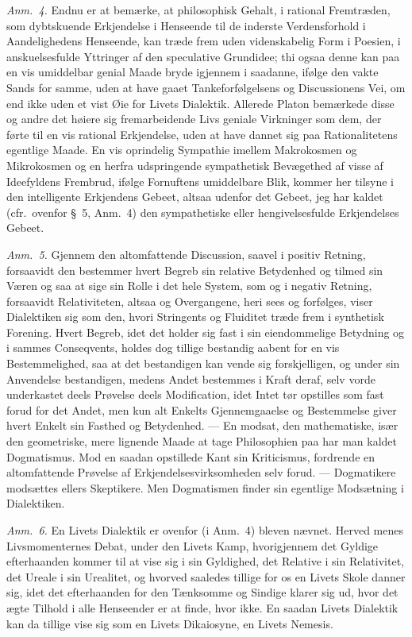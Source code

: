 \documentclass[12pt,a4paper]{book}
\newcommand{\apage}[1]{\marginnote{\footnotesize\textit{[#1]}}}
\begin{document}
{\small\emph{Anm.~4.} Endnu er at bemærke, at philosophisk Gehalt, i rational
Fremtræden, som dybtskuende Erkjendelse i Henseende til de inderste Verdensforhold i
Aandelighedens Henseende, kan træde frem uden videnskabelig Form i Poesien, i
anskuelsesfulde Yttringer af den speculative Grundidee; thi ogsaa denne kan paa en
vis umiddelbar genial Maade bryde igjennem i saadanne, ifølge den vakte Sands for
samme, uden at have gaaet Tankeforfølgelsens og Discussionens Vei, om end ikke uden
et vist Øie for Livets Dialektik. Allerede Platon bemærkede disse og andre det
høiere sig fremarbeidende Livs geniale Virkninger som dem, der førte til en vis
rational Erkjendelse, uden at have dannet sig paa Rationalitetens egentlige Maade. En
vis oprindelig Sympathie imellem Makrokosmen og Mikrokosmen og en herfra
udspringende sympathetisk Bevægethed af visse af Ideefyldens Frembrud, ifølge
Fornuftens umiddelbare Blik, kommer her tilsyne i den intelligente Erkjendens Gebeet,
altsaa udenfor det Gebeet, jeg har kaldet (cfr.\ ovenfor \S~5, Anm.~4) den
sympathetiske eller hengivelsesfulde Erkjendelses Gebeet.\par} \apage{70} 

{\small\emph{Anm.~5.} Gjennem den altomfattende Discussion, saavel i positiv Retning,
forsaavidt den bestemmer hvert Begreb sin relative Betydenhed og tilmed sin Væren og
saa at sige sin Rolle i det hele System, som og i negativ Retning, forsaavidt
Relativiteten, altsaa og Overgangene, heri sees og forfølges, viser Dialektiken sig
som den, hvori Stringents og Fluiditet træde frem i synthetisk Forening. Hvert
Begreb, idet det holder sig fast i sin eiendommelige Betydning og i sammes
Conseqvents, holdes dog tillige bestandig aabent for en vis Bestemmelighed, saa at
det bestandigen kan vende sig forskjelligen, og under sin Anvendelse bestandigen,
medens Andet bestemmes i Kraft deraf, selv vorde underkastet deels Prøvelse deels
Modification, idet Intet tør opstilles som fast forud for det Andet, men kun alt
Enkelts Gjennemgaaelse og Bestemmelse giver hvert Enkelt sin Fasthed og Betydenhed.
--- En modsat, den mathematiske, især den geometriske, mere lignende Maade at tage
Philosophien paa har man kaldet Dogmatismus. Mod en saadan opstillede Kant sin
Kriticismus, fordrende en altomfattende Prøvelse af Erkjendelsesvirksomheden selv
forud. --- Dogmatikere modsættes ellers Skeptikere. Men Dogmatismen finder sin
egentlige Modsætning i Dialektiken.\par}

{\small\emph{Anm.~6.} En Livets Dialektik er ovenfor (i Anm.~4) bleven nævnet.
Herved menes Livsmomenternes Debat, under den Livets Kamp, hvorigjennem det Gyldige
efterhaanden kommer til at vise sig i sin Gyldighed, det Relative i sin Relativitet,
det Ureale i sin Urealitet, og hvorved saaledes tillige for os en Livets Skole danner
sig, idet det efterhaanden for den Tænksomme og Sindige klarer sig ud, hvor det ægte
Tilhold i alle Henseender er at finde, hvor ikke. En saadan Livets Dialektik kan da
tillige vise sig som en Livets Dikaiosyne, en Livets Nemesis.\par} \apage{71} 
\end{document}
